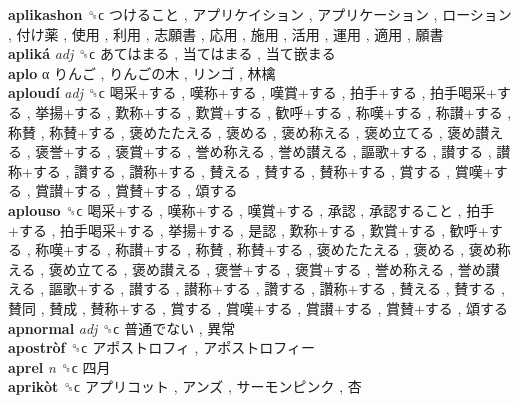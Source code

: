 \textbf{aplikashon} ␝ϲ   つけること ,  アプリケイション ,  アプリケーション ,  ローション ,  付け薬 ,  使用 ,  利用 ,  志願書 ,  応用 ,  施用 ,  活用 ,  運用 ,  適用 ,  願書   \\
\textbf{apliká} \emph{adj}  ␝ϲ   あてはまる ,  当てはまる ,  当て嵌まる   \\
\textbf{aplo} α   りんご ,  りんごの木 ,  リンゴ ,  林檎   \\
\textbf{aploudí} \emph{adj}  ␝ϲ   喝采+する ,  嘆称+する ,  嘆賞+する ,  拍手+する ,  拍手喝采+する ,  挙揚+する ,  歎称+する ,  歎賞+する ,  歓呼+する ,  称嘆+する ,  称讃+する ,  称賛 ,  称賛+する ,  褒めたたえる ,  褒める ,  褒め称える ,  褒め立てる ,  褒め讃える ,  褒誉+する ,  褒賞+する ,  誉め称える ,  誉め讃える ,  謳歌+する ,  讃する ,  讃称+する ,  讚する ,  讚称+する ,  賛える ,  賛する ,  賛称+する ,  賞する ,  賞嘆+する ,  賞讃+する ,  賞賛+する ,  頌する   \\
\textbf{aplouso} ␝ϲ   喝采+する ,  嘆称+する ,  嘆賞+する ,  承認 ,  承認すること ,  拍手+する ,  拍手喝采+する ,  挙揚+する ,  是認 ,  歎称+する ,  歎賞+する ,  歓呼+する ,  称嘆+する ,  称讃+する ,  称賛 ,  称賛+する ,  褒めたたえる ,  褒める ,  褒め称える ,  褒め立てる ,  褒め讃える ,  褒誉+する ,  褒賞+する ,  誉め称える ,  誉め讃える ,  謳歌+する ,  讃する ,  讃称+する ,  讚する ,  讚称+する ,  賛える ,  賛する ,  賛同 ,  賛成 ,  賛称+する ,  賞する ,  賞嘆+する ,  賞讃+する ,  賞賛+する ,  頌する   \\
\textbf{apnormal} \emph{adj}  ␝ϲ   普通でない ,  異常   \\
\textbf{apostròf} ␝ϲ   アポストロフィ ,  アポストロフィー   \\
\textbf{aprel} \emph{n}  ␝ϲ   四月   \\
\textbf{aprikòt} ␝ϲ   アプリコット ,  アンズ ,  サーモンピンク ,  杏   \\
